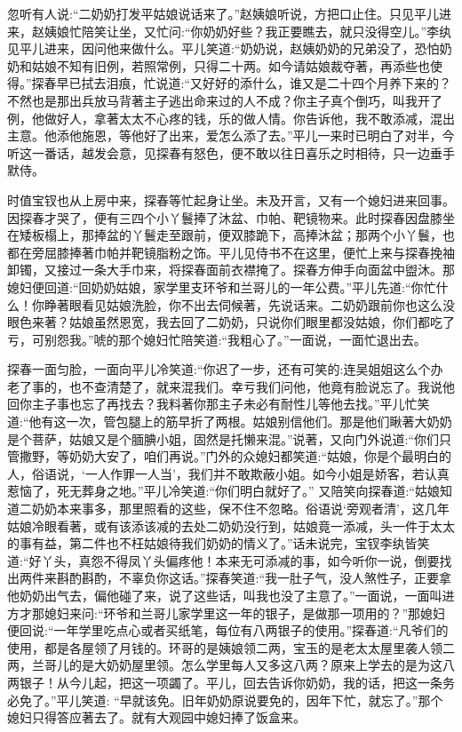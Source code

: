 \begin{parag}
    忽听有人说:“二奶奶打发平姑娘说话来了。”赵姨娘听说，方把口止住。只见平儿进来，赵姨娘忙陪笑让坐，又忙问:“你奶奶好些？我正要瞧去，就只没得空儿。”李纨见平儿进来，因问他来做什么。平儿笑道:“奶奶说，赵姨奶奶的兄弟没了，恐怕奶奶和姑娘不知有旧例，若照常例，只得二十两。如今请姑娘裁夺著，再添些也使得。”探春早已拭去泪痕，忙说道:“又好好的添什么，谁又是二十四个月养下来的？不然也是那出兵放马背著主子逃出命来过的人不成？你主子真个倒巧，叫我开了例，他做好人，拿著太太不心疼的钱，乐的做人情。你告诉他，我不敢添减，混出主意。他添他施恩，等他好了出来，爱怎么添了去。”平儿一来时已明白了对半，今听这一番话，越发会意，见探春有怒色，便不敢以往日喜乐之时相待，只一边垂手默侍。
\end{parag}


\begin{parag}
    时值宝钗也从上房中来，探春等忙起身让坐。未及开言，又有一个媳妇进来回事。因探春才哭了，便有三四个小丫鬟捧了沐盆、巾帕、靶镜物来。此时探春因盘膝坐在矮板榻上，那捧盆的丫鬟走至跟前，便双膝跪下，高捧沐盆；那两个小丫鬟，也都在旁屈膝捧著巾帕并靶镜脂粉之饰。平儿见侍书不在这里，便忙上来与探春挽袖卸镯，又接过一条大手巾来，将探春面前衣襟掩了。探春方伸手向面盆中盥沐。那媳妇便回道:“回奶奶姑娘，家学里支环爷和兰哥儿的一年公费。”平儿先道:“你忙什么！你睁著眼看见姑娘洗脸，你不出去伺候著，先说话来。二奶奶跟前你也这么没眼色来著？姑娘虽然恩宽，我去回了二奶奶，只说你们眼里都没姑娘，你们都吃了亏，可别怨我。”唬的那个媳妇忙陪笑道:“我粗心了。”一面说，一面忙退出去。
\end{parag}


\begin{parag}
    探春一面匀脸，一面向平儿冷笑道:“你迟了一步，还有可笑的:连吴姐姐这么个办老了事的，也不查清楚了，就来混我们。幸亏我们问他，他竟有脸说忘了。我说他回你主子事也忘了再找去？我料著你那主子未必有耐性儿等他去找。”平儿忙笑道:“他有这一次，管包腿上的筋早折了两根。姑娘别信他们。那是他们瞅著大奶奶是个菩萨，姑娘又是个腼腆小姐，固然是托懒来混。”说著，又向门外说道:“你们只管撒野，等奶奶大安了，咱们再说。”门外的众媳妇都笑道:“姑娘，你是个最明白的人，俗语说，‘一人作罪一人当’，我们并不敢欺蔽小姐。如今小姐是娇客，若认真惹恼了，死无葬身之地。”平儿冷笑道:“你们明白就好了。” 又陪笑向探春道:“姑娘知道二奶奶本来事多，那里照看的这些，保不住不忽略。俗语说‘旁观者清’，这几年姑娘冷眼看著，或有该添该减的去处二奶奶没行到，姑娘竟一添减，头一件于太太的事有益，第二件也不枉姑娘待我们奶奶的情义了。”话未说完，宝钗李纨皆笑道:“好丫头，真怨不得凤丫头偏疼他！本来无可添减的事，如今听你一说，倒要找出两件来斟酌斟酌，不辜负你这话。”探春笑道:“我一肚子气，没人煞性子，正要拿他奶奶出气去，偏他碰了来，说了这些话，叫我也没了主意了。”一面说，一面叫进方才那媳妇来问:“环爷和兰哥儿家学里这一年的银子，是做那一项用的？”那媳妇便回说:“一年学里吃点心或者买纸笔，每位有八两银子的使用。”探春道:“凡爷们的使用，都是各屋领了月钱的。环哥的是姨娘领二两，宝玉的是老太太屋里袭人领二两，兰哥儿的是大奶奶屋里领。怎么学里每人又多这八两？原来上学去的是为这八两银子！从今儿起，把这一项蠲了。平儿，回去告诉你奶奶，我的话，把这一条务必免了。”平儿笑道: “早就该免。旧年奶奶原说要免的，因年下忙，就忘了。”那个媳妇只得答应著去了。就有大观园中媳妇捧了饭盒来。
\end{parag}


